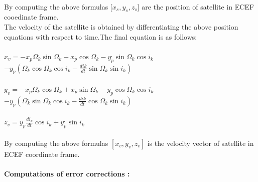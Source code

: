\documentclass[10pt]{book}
\begin{document}
\\
By computing the above formulas [$x_s,y_s,z_s$] are the position of satellite in ECEF cooedinate frame.\\
The velocity of the satellite is obtained by differentiating the above position equations with respect to time.The final equation is as follows: 
\\
\\
$x_v = -x_p \Omega_k^. \sin \Omega_k + x_p^. \cos \Omega_k - y_p^. \sin \Omega_k \cos i_k$ \\
$-y_p(\Omega_k^.\cos \Omega_k \cos i_k - \frac{dik}{dt} \sin \Omega_k \sin i_k )$ \\
\\
$y_v = -x_p \Omega_k^. \cos \Omega_k + x_p^. \sin \Omega_k - y_p^. \cos \Omega_k \cos i_k$ \\
$-y_p(\Omega_k^.\sin \Omega_k \cos i_k - \frac{dik}{dt} \cos \Omega_k \sin i_k )$ \\
\\
$z_v = y_p\frac{di_k}{dt}\cos i_k + y_p^.\sin i_k$
\\
\\
By computing the above formulas $[x_v,y_v,z_v]$ is the velocity vector of satellite in ECEF coordinate frame. 
\\
\\
\textbf{Computations of error corrections :} 
\end{document}
